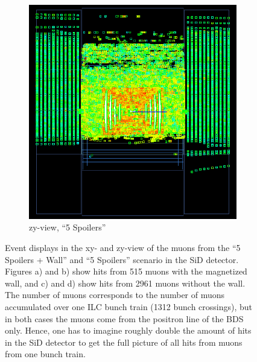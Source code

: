 \begin{figure}
\begin{subfigure}[b]{0.49\textwidth}
\begin{center}
        \includegraphics[height=0.3\textheight]{figures/muons_positron_5spoilers_2961_zyview_croped.png}
        \caption{zy-view, ``5 Spoilers''}
        \label{fig:zy_5Spoilers}
    \end{center}
    \end{subfigure}
    \caption[Event displays of muons in SiD]{
    Event displays in the xy- and zy-view of the muons from the ``5 Spoilers + Wall'' and ``5 Spoilers'' scenario in the SiD detector.
    Figures a) and b) show hits from 515 muons with the magnetized wall, and c) and d) show hits from 2961 muons without the wall.
    The number of muons corresponds to the number of muons accumulated over one ILC bunch train (1312 bunch crossings), but in both cases the muons come from the positron line of the BDS only.
    Hence, one has to imagine roughly double the amount of hits in the SiD detector to get the full picture of all hits from muons from one bunch train.
    }
    \label{fig:WIRED4}
\end{figure}

